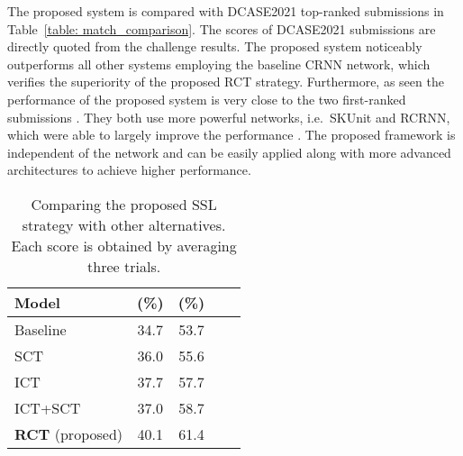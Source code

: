 \documentclass[a4paper]{article}
\begin{document}
The proposed system is compared with DCASE2021 top-ranked submissions in Table~\ref{table: match_comparison}. The scores of DCASE2021 submissions are directly quoted from the challenge results. The proposed system noticeably outperforms all other systems employing the baseline CRNN network, which verifies the superiority of the proposed RCT strategy. Furthermore, as seen the performance of the proposed system is very close to the two first-ranked submissions \cite{Zheng2021, Kim2021}. They both use more powerful networks, i.e.~SKUnit and RCRNN, which were able to largely improve the performance \cite{Zheng2021, Kim2021}. The proposed framework is independent of the network and can be easily applied along with more advanced architectures to achieve higher performance.

\begin{table}[]
    \centering
    \caption{Comparing the proposed SSL strategy with other alternatives. Each score is obtained by averaging three trials.}
    \begin{tabular}{lcccc}
        \toprule
        \textbf{Model}  & \textbf{} (\%)  & \textbf{} (\%) \\
        \midrule
        Baseline \cite{jiakai2018mean}                 
        & 34.7  & 53.7 \\
        SCT \cite{koh2021sound}                         
        & 36.0  & 55.6 \\
        ICT \cite{verma2019interpolation}               
        & 37.7  & 57.7 \\
        ICT+SCT \cite{koh2021sound}                     
        & 37.0	& 58.7 \\
        \textbf{RCT} (proposed)                         
        & 40.1  & 61.4 \\
        \bottomrule
    \end{tabular}
    \label{table: comparision}
\end{table}
\end{document}
